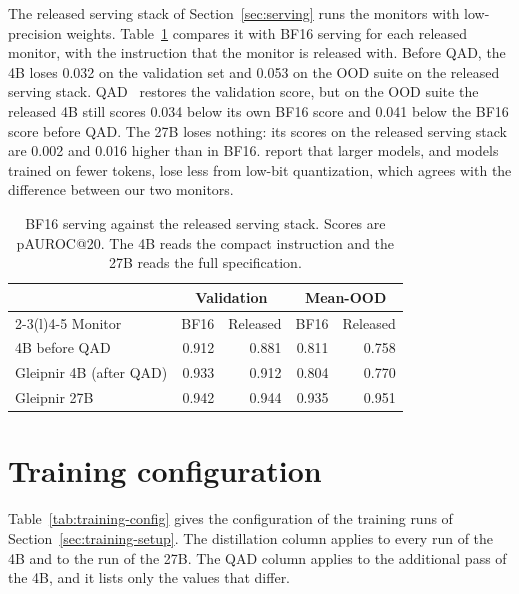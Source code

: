 The released serving stack of Section~\ref{sec:serving} runs the monitors with low-precision weights.
Table~\ref{tab:precision} compares it with BF16 serving for each released monitor, with the instruction that the monitor is released with.
Before QAD, the 4B loses 0.032 on the validation set and 0.053 on the OOD suite on the released serving stack.
QAD~\citep{xin2026qad} restores the validation score, but on the OOD suite the released 4B still scores 0.034 below its own BF16 score and 0.041 below the BF16 score before QAD.
The 27B loses nothing: its scores on the released serving stack are 0.002 and 0.016 higher than in BF16.
\citet{ouyang2025lowbit} report that larger models, and models trained on fewer tokens, lose less from low-bit quantization, which agrees with the difference between our two monitors.

\begin{table}[h]
\caption{BF16 serving against the released serving stack. Scores are pAUROC@20. The 4B reads the compact instruction and the 27B reads the full specification.}
\label{tab:precision}
\centering
\small
\begin{tabular}{@{}lrrrr@{}}
\toprule
 & \multicolumn{2}{c}{Validation} & \multicolumn{2}{c}{Mean-OOD} \\
\cmidrule(lr){2-3}\cmidrule(l){4-5}
Monitor & BF16 & Released & BF16 & Released \\
\midrule
4B before QAD & 0.912 & 0.881 & 0.811 & 0.758 \\
Gleipnir 4B (after QAD) & 0.933 & 0.912 & 0.804 & 0.770 \\
Gleipnir 27B & 0.942 & 0.944 & 0.935 & 0.951 \\
\bottomrule
\end{tabular}
\end{table}

\section{Training configuration}
\label{app:training-config}

Table~\ref{tab:training-config} gives the configuration of the training runs of Section~\ref{sec:training-setup}.
The distillation column applies to every run of the 4B and to the run of the 27B.
The QAD column applies to the additional pass of the 4B, and it lists only the values that differ.

